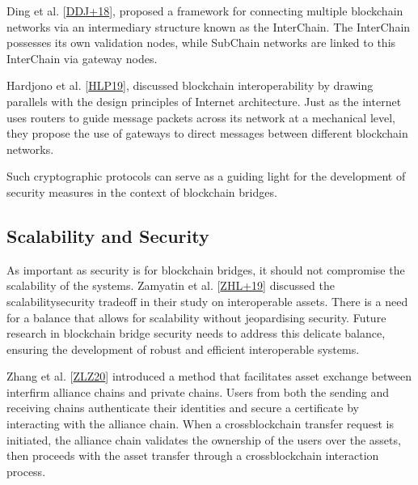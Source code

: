 \documentclass[letterpaper,10pt,english]{jupyterBook}
\begin{document}
\sphinxAtStartPar
Ding et al. {[}\hyperlink{cite.BBSecurity/bbsecurity:id89}{DDJ+18}{]}, proposed a framework for connecting multiple blockchain networks via an intermediary structure known as the InterChain. The InterChain possesses its own validation nodes, while SubChain networks are linked to this InterChain via gateway nodes.

\sphinxAtStartPar
Hardjono et al. {[}\hyperlink{cite.BBSecurity/bbsecurity:id95}{HLP19}{]}, discussed blockchain interoperability by drawing parallels with the design principles of Internet architecture. Just as the internet uses routers to guide message packets across its network at a mechanical level, they propose the use of gateways to direct messages between different blockchain networks.

\sphinxAtStartPar
Such cryptographic protocols can serve as a guiding light for the development of security measures in the context of blockchain bridges.


\subsection{Scalability and Security}
\label{\detokenize{BBSecurity/bbsecurity:scalability-and-security}}
\sphinxAtStartPar
As important as security is for blockchain bridges, it should not compromise the scalability of the systems. Zamyatin et al. {[}\hyperlink{cite.BBSecurity/bbsecurity:id98}{ZHL+19}{]} discussed the scalability\sphinxhyphen{}security trade\sphinxhyphen{}off in their study on interoperable assets. There is a need for a balance that allows for scalability without jeopardising security. Future research in blockchain bridge security needs to address this delicate balance, ensuring the development of robust and efficient interoperable systems.

\sphinxAtStartPar
Zhang et al. {[}\hyperlink{cite.BBSecurity/bbsecurity:id90}{ZLZ20}{]} introduced a method that facilitates asset exchange between inter\sphinxhyphen{}firm alliance chains and private chains. Users from both the sending and receiving chains authenticate their identities and secure a certificate by interacting with the alliance chain. When a cross\sphinxhyphen{}blockchain transfer request is initiated, the alliance chain validates the ownership of the users over the assets, then proceeds with the asset transfer through a cross\sphinxhyphen{}blockchain interaction process.
\end{document}
